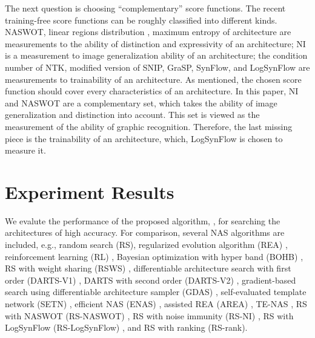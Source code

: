 \documentclass[sigconf]{acmart}
\begin{document}
    The next question is choosing ``complementary'' score functions. The recent training-free 
    score functions can be roughly classified into different kinds. NASWOT, 
    linear regions distribution \cite{https://doi.org/10.48550/arxiv.2102.11535} \cite{lin2021zennas}, 
    maximum entropy of architecture \cite{sun2022maedet} are measurements 
    to the ability of distinction and expressivity of an architecture; 
    NI is a measurement to image generalization ability of an architecture; 
    the condition number of NTK, modified version of SNIP, GraSP, SynFlow, and 
    LogSynFlow are measurements to trainability of an architecture. 
    As mentioned, the chosen score function should cover every characteristics 
    of an architecture. In this paper, NI and NASWOT are a complementary set, 
    which takes the ability of image generalization and distinction into account. 
    This set is viewed as the measurement of the ability of graphic 
    recognition. Therefore, the last missing piece is the trainability of an 
    architecture, which, LogSynFlow is chosen to measure it. 

    \section{Experiment Results}
    \label{sec:results}

    We evalute the performance of the proposed algorithm, \palg{}, 
    for searching the architectures of high accuracy. For comparison, several NAS 
    algorithms are included, e.g., random search (RS), regularized evolution algorithm 
    (REA) \cite{real2019regularized}, reinforcement learning (RL) \cite{Williams:92}, 
    Bayesian optimization with hyper band (BOHB) \cite{falkner2018bohb}, RS with 
    weight sharing (RSWS) \cite{li2019random}, differentiable architecture search 
    with first order (DARTS-V1) \cite{liu2019darts}, DARTS with second order 
    (DARTS-V2) \cite{liu2019darts}, gradient-based search using differentiable 
    architecture sampler (GDAS) \cite{dong2019searching}, self-evaluated template 
    network (SETN) \cite{Dong_2019}, efficient NAS (ENAS) \cite{pham2018efficient}, 
    assisted REA (AREA) \cite{https://doi.org/10.48550/arxiv.2006.04647}, 
    TE-NAS \cite{https://doi.org/10.48550/arxiv.2102.11535}, RS with NASWOT (RS-NASWOT) \cite{https://doi.org/10.48550/arxiv.2006.04647}, 
    RS with noise immunity (RS-NI) \cite{10092788}, RS with LogSynFlow (RS-LogSynFlow) \cite{Cavagnero_2023}, 
    and RS with ranking (RS-rank). 
\end{document}
